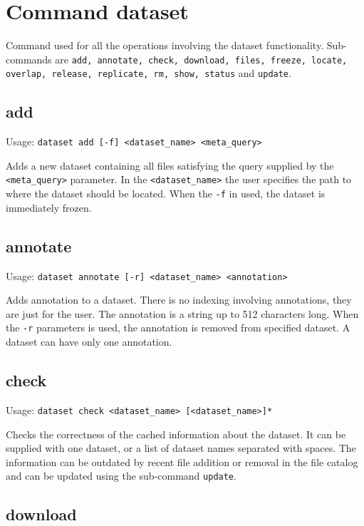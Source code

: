 \section{Command dataset}
Command used for all the operations involving the dataset
functionality. Sub-commands are \texttt{add, annotate, check,
download, files, freeze, locate, overlap, release, replicate, rm,
show, status} and \texttt{update}.

\subsection{add}

Usage: \texttt{dataset add [-f] <dataset\_name> <meta\_query>}

Adds a new dataset containing all files satisfying the query
supplied by the \texttt{<meta\_query>} parameter. In the
\texttt{<dataset\_name>} the user specifies the path to where the
dataset should be located. When the \texttt{-f} in used, the
dataset is immediately frozen.

\subsection{annotate}

Usage: \texttt{dataset annotate [-r] <dataset\_name> <annotation>}

Adds annotation to a dataset. There is no indexing involving
annotations, they are just for the user. The annotation is a string
up to 512 characters long. When the \texttt{-r} parameters is used,
the annotation is removed from specified dataset. A dataset can
have only one annotation.

\subsection{check}

Usage: \texttt{dataset check <dataset\_name> [<dataset\_name>]*}

Checks the correctness of the cached information about the dataset.
It can be supplied with one dataset, or a list of dataset names
separated with spaces. The information can be outdated by recent
file addition or removal in the file catalog and can be updated
using the sub-command \texttt{update}.

\subsection{download}

